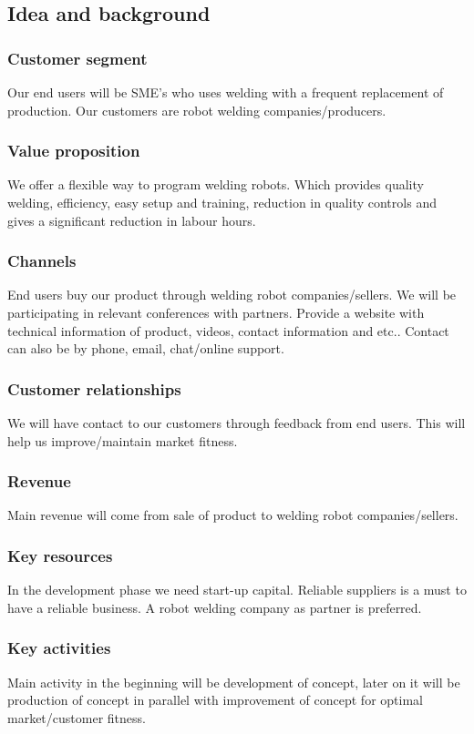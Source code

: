 \subsection{Idea and background}

\subsubsection{Customer segment}
Our end users will be SME's who uses welding with a frequent replacement of production. Our customers are robot welding companies/producers.
\subsubsection{Value proposition}
We offer a flexible way to program welding robots. Which provides quality welding, efficiency, easy setup and training, reduction in quality controls and gives a significant reduction in labour hours.
\subsubsection{Channels}
End users buy our product through welding robot companies/sellers. We will be participating in relevant conferences with partners. Provide a website with technical information of product, videos, contact information and etc.. Contact can also be by phone, email, chat/online support.	
\subsubsection{Customer relationships}
We will have contact to our customers through feedback from end users. This will help us improve/maintain market fitness.
\subsubsection{Revenue}
Main revenue will come from sale of product to welding robot companies/sellers.
\subsubsection{Key resources}
In the development phase we need start-up capital. Reliable suppliers is a must to have a reliable business. A robot welding company as partner is preferred. 
\subsubsection{Key activities}
Main activity in the beginning will be development of concept, later on it will be production of concept in parallel with improvement of concept for optimal market/customer fitness.
